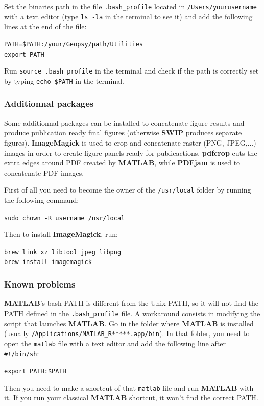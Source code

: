 \documentclass[twoside,a4paper]{article}
\def\SWIP{\textbf{SWIP}}
\def\ImageMagick{\textbf{ImageMagick}}
\def\PDFjam{\textbf{PDFjam}}
\def\pdfcrop{\textbf{pdfcrop}}
\def\MATLAB{\textbf{MATLAB}}
\begin{document}
Set the binaries path in the file \verb|.bash_profile| located in \verb|/Users/yourusername| with a text editor (type \verb|ls -la| in the terminal to see it) and add the following lines at the end of the file:

\verb|PATH=$PATH:/your/Geopsy/path/Utilities|\\
\verb|export PATH|

Run \verb|source .bash_profile| in the terminal and check if the path is correctly set by typing \verb|echo $PATH| in the terminal.

\subsubsection{Additionnal packages}
Some additionnal packages can be installed to concatenate figure results and produce publication ready final figures (otherwise {\SWIP} produces separate figures). {\ImageMagick} is used to crop and concatenate raster (PNG, JPEG,...) images in order to create figure panels ready for publicactions. {\pdfcrop} cuts the extra edges around PDF created by {\MATLAB}, while {\PDFjam} is used to concatenate PDF images.

First of all you need to become the owner of the \verb|/usr/local| folder by running the following command:

\verb|sudo chown -R username /usr/local|

Then to install {\ImageMagick}, run:

\verb|brew link xz libtool jpeg libpng|\\
\verb|brew install imagemagick|

\subsubsection{Known problems}
{\MATLAB}'s bash PATH is different from the Unix PATH, so it will not find the PATH defined in the \verb|.bash_profile| file. A workaround consists in modifying the script that launches {\MATLAB}. Go in the folder where {\MATLAB} is installed (usually \verb|/Applications/MATLAB_R*****.app/bin|). In that folder, you need to open the \verb|matlab| file with a text editor and add the following line after \verb|#!/bin/sh|:

\verb|export PATH:$PATH|

Then you need to make a shortcut of that \verb|matlab| file and run {\MATLAB} with it. If you run your classical {\MATLAB} shortcut, it won't find the correct PATH.
\end{document}
